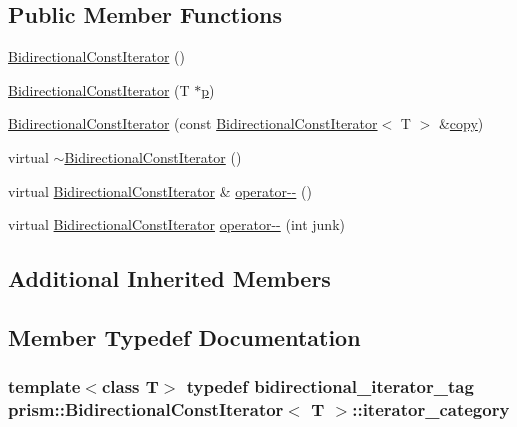 \subsection*{Public Member Functions}
\begin{DoxyCompactItemize}
\item 
\hyperlink{classprism_1_1_bidirectional_const_iterator_a0881c1366c162179a1520a5839405d91}{Bidirectional\+Const\+Iterator} ()
\item 
\hyperlink{classprism_1_1_bidirectional_const_iterator_ad978eb6303350cf1792ea08cbea3a69e}{Bidirectional\+Const\+Iterator} (T $\ast$\hyperlink{classprism_1_1_forward_const_iterator_ad4e0c824b923c399c6ee381a03e66df2}{p})
\item 
\hyperlink{classprism_1_1_bidirectional_const_iterator_a56b09aacc65ce4e85dd5bafadea743e5}{Bidirectional\+Const\+Iterator} (const \hyperlink{classprism_1_1_bidirectional_const_iterator}{Bidirectional\+Const\+Iterator}$<$ T $>$ \&\hyperlink{namespaceprism_ae776f4cd825f79e7af1cf6ee1d90a209}{copy})
\item 
virtual \hyperlink{classprism_1_1_bidirectional_const_iterator_af102c28eb4cfb7abe7536b2b3cf6a8a2}{$\sim$\+Bidirectional\+Const\+Iterator} ()
\item 
virtual \hyperlink{classprism_1_1_bidirectional_const_iterator}{Bidirectional\+Const\+Iterator} \& \hyperlink{classprism_1_1_bidirectional_const_iterator_a07e29d93a60b80b710b1953aa2a2eefd}{operator-\/-\/} ()
\item 
virtual \hyperlink{classprism_1_1_bidirectional_const_iterator}{Bidirectional\+Const\+Iterator} \hyperlink{classprism_1_1_bidirectional_const_iterator_ae15fb4417b2e026f547d1eb1a71306fe}{operator-\/-\/} (int junk)
\end{DoxyCompactItemize}
\subsection*{Additional Inherited Members}


\subsection{Member Typedef Documentation}
\subsubsection[{\texorpdfstring{iterator\+\_\+category}{iterator_category}}]{\setlength{\rightskip}{0pt plus 5cm}template$<$class T$>$ typedef {\bf bidirectional\+\_\+iterator\+\_\+tag} {\bf prism\+::\+Bidirectional\+Const\+Iterator}$<$ T $>$\+::{\bf iterator\+\_\+category}}\hypertarget{classprism_1_1_bidirectional_const_iterator_a71244ea545ce4dd225e6ad1e5d6f64a6}{}\label{classprism_1_1_bidirectional_const_iterator_a71244ea545ce4dd225e6ad1e5d6f64a6}


